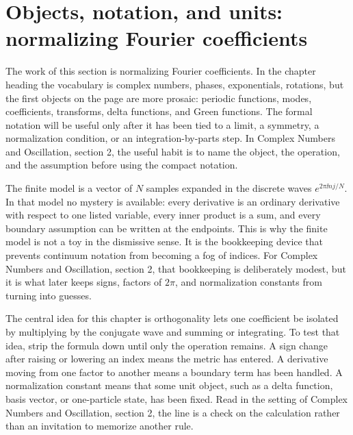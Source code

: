 \section{Objects, notation, and units: normalizing Fourier coefficients}













The work of this section is normalizing Fourier coefficients.  In the chapter heading the vocabulary is complex numbers, phases, exponentials, rotations, but the first objects on the page are more prosaic: periodic functions, modes, coefficients, transforms, delta functions, and Green functions.  The formal notation will be useful only after it has been tied to a limit, a symmetry, a normalization condition, or an integration-by-parts step.  In Complex Numbers and Oscillation, section 2, the useful habit is to name the object, the operation, and the assumption before using the compact notation.

The finite model is a vector of \(N\) samples expanded in the discrete waves \(e^{2\pi \ii nj/N}\).  In that model no mystery is available: every derivative is an ordinary derivative with respect to one listed variable, every inner product is a sum, and every boundary assumption can be written at the endpoints.  This is why the finite model is not a toy in the dismissive sense.  It is the bookkeeping device that prevents continuum notation from becoming a fog of indices.  For Complex Numbers and Oscillation, section 2, that bookkeeping is deliberately modest, but it is what later keeps signs, factors of \(2\pi\), and normalization constants from turning into guesses.

The central idea for this chapter is orthogonality lets one coefficient be isolated by multiplying by the conjugate wave and summing or integrating.  To test that idea, strip the formula down until only the operation remains.  A sign change after raising or lowering an index means the metric has entered.  A derivative moving from one factor to another means a boundary term has been handled.  A normalization constant means that some unit object, such as a delta function, basis vector, or one-particle state, has been fixed.  Read in the setting of Complex Numbers and Oscillation, section 2, the line is a check on the calculation rather than an invitation to memorize another rule.


